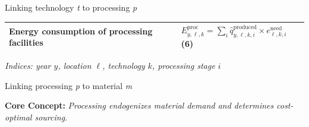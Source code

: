 \documentclass[10pt]{beamer}
\begin{document}
\begin{frame}{Linking technology \textit{t} to processing \textit{p}}
\begin{table}[H]
{\begin{tabular}{>{\raggedright\arraybackslash}p{} | >{\raggedright\arraybackslash}p{}}
            Energy consumption of processing facilities & 
            $\displaystyle E^{\mathrm{proc}}_{y,\ell,k} = \sum_{i} \hat{q}^{\mathrm{produced}}_{y,\ell,k,i} \times e^{\mathrm{need}}_{\ell,k,i}$ \hfill (6) \\
            \bottomrule
        \end{tabular}
        }
    \end{table}
    
    \vspace{-0.2cm}
    \begin{center}
        \scriptsize \textit{Indices: year $y$, location $\ell$, technology $k$, processing stage $i$}
    \end{center}
\end{frame}

\begin{frame}{Linking processing \textit{p} to material \textit{m}}
    
    \textbf{\textcolor{metublue}{Core Concept:}} \textit{Processing endogenizes material demand and determines cost-optimal sourcing.}
    \vspace{0.2cm}

    \begin{table}[H]
        \centering
        \renewcommand{\arraystretch}{2.0}
\end{table}
\end{frame}
\end{document}
